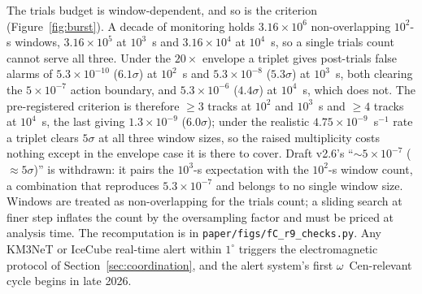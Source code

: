 \documentclass[11pt]{article}
\newcommand{\ocen}{\ensuremath{\omega}~Cen}
\begin{document}
The trials budget is window-dependent, and so is the criterion (Figure~\ref{fig:burst}). A decade of monitoring holds $3.16\times10^{6}$ non-overlapping $10^{2}$-s windows, $3.16\times10^{5}$ at $10^{3}$~s and $3.16\times10^{4}$ at $10^{4}$~s, so a single trials count cannot serve all three. Under the $20\times$ envelope a triplet gives post-trials false alarms of $5.3\times10^{-10}$ ($6.1\sigma$) at $10^{2}$~s and $5.3\times10^{-8}$ ($5.3\sigma$) at $10^{3}$~s, both clearing the $5\times10^{-7}$ action boundary, and $5.3\times10^{-6}$ ($4.4\sigma$) at $10^{4}$~s, which does not. The pre-registered criterion is therefore $\geq 3$ tracks at $10^{2}$ and $10^{3}$~s and $\geq 4$ tracks at $10^{4}$~s, the last giving $1.3\times10^{-9}$ ($6.0\sigma$); under the realistic $4.75\times10^{-9}$~s$^{-1}$ rate a triplet clears $5\sigma$ at all three window sizes, so the raised multiplicity costs nothing except in the envelope case it is there to cover. Draft v2.6's ``$\sim 5\times10^{-7}$ ($\approx 5\sigma$)'' is withdrawn: it pairs the $10^{3}$-s expectation with the $10^{2}$-s window count, a combination that reproduces $5.3\times10^{-7}$ and belongs to no single window size. Windows are treated as non-overlapping for the trials count; a sliding search at finer step inflates the count by the oversampling factor and must be priced at analysis time. The recomputation is in \texttt{paper/figs/fC\_r9\_checks.py}. Any KM3NeT or IceCube real-time alert within $1^{\circ}$ triggers the electromagnetic protocol of Section~\ref{sec:coordination}, and the alert system's first \ocen-relevant cycle begins in late 2026.
\end{document}

